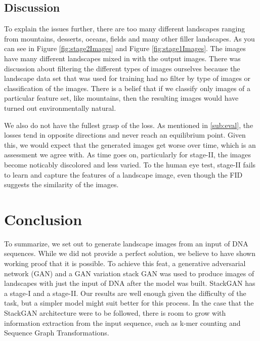 \documentclass{article}
\begin{document}
	\subsection{Discussion}	

	To explain the issues further, there are too many different landscapes ranging from mountains, desserts, oceans, fields and many other filler landscapes. As you can see in Figure  \ref{fig:stage2Images} and Figure \ref{fig:stage1Images}. The images have many different landscapes mixed in with the output images. There was discussion about filtering the different types of images ourselves because the landscape data set that was used for training had no filter by type of images or classification of the images. There is a belief that if we classify only images of a particular feature set, like mountains, then the resulting images would have turned out environmentally natural.

	We also do not have the fullest grasp of the loss. As mentioned in \ref{sub:eval}, the losses tend in opposite directions and never reach an equilibrium point. Given this, we would expect that the generated images get worse over time, which is an assessment we agree with. As time goes on, particularly for stage-II, the images become noticably discolored and less varied. To the human eye test, stage-II fails to learn and capture the features of a landscape image, even though the FID suggests the similarity of the images.


	\section{Conclusion}

	 To summarize, we set out to generate landscape images from an input of DNA sequences. While we did not provide a perfect solution, we believe to have shown working proof that it is possible. To achieve this feat, a generative adversarial network (GAN) and a GAN variation stack GAN was used to produce images of landscapes with just the input of DNA after the model was built. StackGAN has a stage-I and a stage-II. Our results are well enough given the difficulty of the task, but a simpler model might suit better for this process. In the case that the StackGAN architecture were to be followed, there is room to grow with information extraction from the input sequence, such as k-mer counting and Sequence Graph Transformations.
\end{document}

